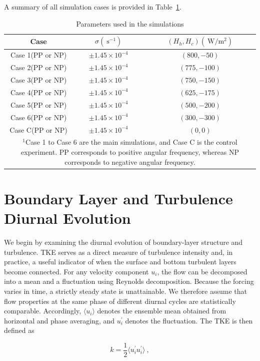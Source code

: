 \documentclass[draft]{agujournal2019}
\begin{document}
A summary of all simulation cases is provided in Table~\ref{table:setup}.
\begin{table}
\caption{Parameters used in the simulations}
\centering
\begin{tabular}{c c c }
\hline
 Case  & $\sigma(\ \mathrm{s^{-1}})$ & $(H_{h}, H_{c})(\ \mathrm{W/m^{2}})$ \\
\hline
    Case 1(PP or NP) &  $\pm1.45\times10^{-4}$ & $(800, -50)$ \\
    Case 2(PP or NP) &  $\pm1.45\times10^{-4}$ & $(775, -100)$ \\
    Case 3(PP or NP) & $\pm1.45\times10^{-4}$ & $(750, -150)$ \\
    Case 4(PP or NP) & $\pm1.45\times10^{-4}$ & $(625, -175)$ \\
    Case 5(PP or NP) & $\pm1.45\times10^{-4}$ & $(500, -200)$ \\
    Case 6(PP or NP) & $\pm1.45\times10^{-4}$ & $(300, -300)$ \\
    Case C(PP or NP) & $\pm1.45\times10^{-4}$ & $(0, 0)$ \\
\hline
\multicolumn{3}{p{0.6\textwidth}}{$^{1}$Case 1 to Case 6 are the main simulations, and Case C is the control experiment. PP corresponds to positive angular frequency, whereas NP corresponds to negative angular frequency.} \\
\end{tabular}
\label{table:setup}
\end{table}

\section{Boundary Layer and Turbulence Diurnal Evolution}
\label{sec:TKE}
We begin by examining the diurnal evolution of boundary-layer structure and turbulence. TKE serves as a direct measure of turbulence intensity and, in practice, a useful indicator of when the surface and bottom turbulent layers become connected.
For any velocity component $u_i$, the flow can be decomposed into a mean and a fluctuation using Reynolds decomposition. Because the forcing varies in time, a strictly steady state is unattainable. We therefore assume that flow properties at the same phase of different diurnal cycles are statistically comparable. Accordingly, $\langle u_i\rangle$ denotes the ensemble mean obtained from horizontal and phase averaging, and $u_{i}^\prime$ denotes the fluctuation.
The TKE is then defined as
\begin{linenomath*}
\begin{equation}
k=\frac{1}{2}\langle u_i^\prime u_i^\prime\rangle\ ,
\label{eq:TKE}
\end{equation}
\end{linenomath*}
\end{document}
